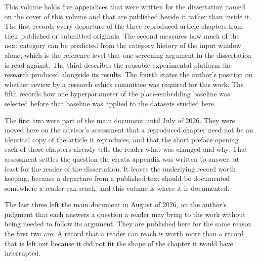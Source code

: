 \documentclass[
    12pt,
    openright,
    oneside,
    a4paper,
    sumario=tradicional,
    brazil,
    english,
]{abntex2}
\begin{document}
    This volume holds five appendices that were %
    written for the dissertation named on the
    cover of this volume and that are published beside it rather than inside it. The first
    records every departure of the three reproduced article chapters from their published or
    submitted originals. The second measures how much of the next category can be predicted from
    the category history of the input window alone, which is the reference level that one screening
    argument in the dissertation is read against. The third describes the reusable experimental
    platform the research produced alongside its results. The fourth states the author's position on
    whether review by a research ethics committee was required for this work. The fifth records how
    one hyperparameter of the place-embedding baseline was selected before that baseline was applied
    to the datasets studied here.

    The first two were part of the main document until July of 2026. They were moved here on the
    advisor's assessment that a reproduced chapter need not be an identical copy of the article
    it reproduces, and that the short preface opening each of those chapters already tells the
    reader what was changed and why. That assessment settles the question the errata appendix
    was written to answer, at least for the reader of the dissertation. It leaves the underlying
    record worth keeping, because a departure from a published text should be documented
    somewhere a reader can reach, and this volume is where it is documented.

    The last three left the main document in August of 2026, on the author's judgment that each
    answers a question a reader may bring to the work without being needed to follow its argument.
    They are published here for the same reason the first two are. A record that a reader can reach
    is worth more than a record that is left out because it did not fit the shape of the chapter it
    would have interrupted.
\end{document}
